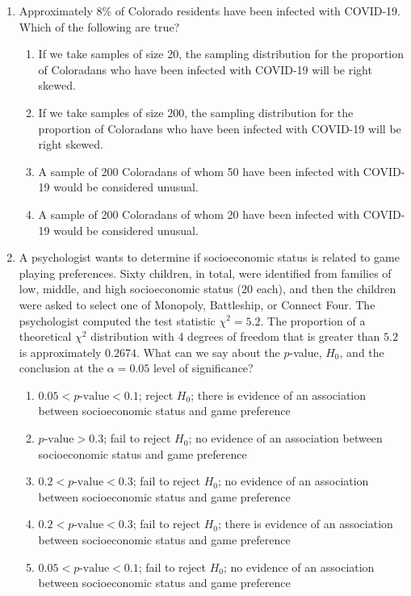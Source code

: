 \documentclass[12pt,fullpage]{amsart}
\begin{document}
\begin{enumerate}
      \vfill
      
\item Approximately 8\% of Colorado residents have been infected with COVID-19. Which of the following are true?
  \begin{enumerate}
  \item If we take samples of size 20, the sampling distribution for the proportion of Coloradans who have been infected with COVID-19 will be right skewed.
  \item If we take samples of size 200, the sampling distribution for the proportion of Coloradans who have been infected with COVID-19 will be right skewed.
  \item A sample of 200 Coloradans of whom 50 have been infected with COVID-19 would be considered unusual.
  \item A sample of 200 Coloradans of whom 20 have been infected with COVID-19 would be considered unusual.
  \end{enumerate}
    

      
\item
A psychologist wants to determine if socioeconomic status is related to game playing preferences.  Sixty children, in total, were identified from families of low, middle, and high socioeconomic status (20 each), and then the children were asked to select one of Monopoly, Battleship, or Connect Four. The psychologist computed the test statistic $\chi^2=5.2$. The proportion of a theoretical $\chi^2$ distribution with 4 degrees of freedom that is greater than $5.2$ is approximately $0.2674$. What can we say about the $p$-value, $H_0$, and the conclusion at the $\alpha=0.05$ level of significance?

\begin{enumerate}
    \item
    $0.05 < p\mbox{-value} < 0.1$; reject $H_0$; there is evidence of an association between socioeconomic status and game preference
    \item
    $p\mbox{-value} > 0.3$; fail to reject $H_0$; no evidence of an association between socioeconomic status and game preference
    \item
    $0.2 < p\mbox{-value} < 0.3$; fail to reject $H_0$; no evidence of an association between socioeconomic status and game preference
    \item
    $0.2 < p\mbox{-value} < 0.3$; fail to reject $H_0$; there is evidence of an association between socioeconomic status and game preference
    \item
    $0.05 < p\mbox{-value} < 0.1$; fail to reject $H_0$; no evidence of an association between socioeconomic status and game preference
\end{enumerate}


\end{enumerate}
\end{document}
